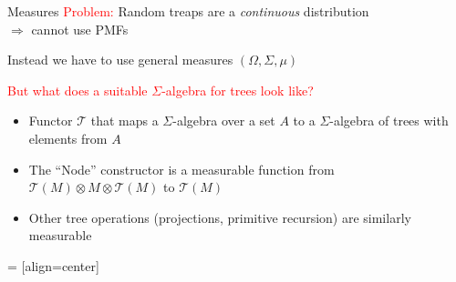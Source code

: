 \documentclass[%
	sans,
	12pt,
]{beamer}
\newcommand{\bad}[1]{\textcolor{red}{#1}}
\begin{document}
\begin{frame}{Measures}
\bad{Problem:} Random treaps are a \emph{continuous} distribution\\ $\Longrightarrow$ cannot use PMFs\\[1em]\pause

Instead we have to use general measures $(\Omega, \Sigma, \mu)$\\[1em]\pause

\bad{But what does a suitable $\Sigma$-algebra for trees look like?}\pause
\begin{itemize}
\item Functor $\mathcal T$ that maps a $\Sigma$-algebra over a set $A$ to a $\Sigma$-algebra of trees with elements from $A$\pause
\item The \enquote{Node} constructor is a measurable function from $\mathcal T(M)\otimes M\otimes \mathcal T(M)$ to $\mathcal T(M)$\pause
\item Other tree operations (projections, primitive recursion) are similarly measurable
\end{itemize}
\end{frame}

 = [align=center]
\begin{frame}
\begin{center}
\hspace*{2em}
\end{center}
\end{frame}
\end{document}
